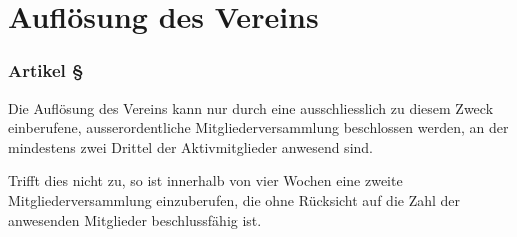 \section{Auflösung des Vereins}

\subsubsection*{Artikel §\articlenumber}
Die Auflösung des Vereins kann nur durch eine ausschliesslich zu diesem Zweck
einberufene, ausserordentliche Mitgliederversammlung beschlossen werden, an
der mindestens zwei Drittel der Aktivmitglieder anwesend sind.

Trifft dies nicht zu, so ist innerhalb von vier Wochen eine zweite
Mitgliederversammlung einzuberufen, die ohne Rücksicht auf die Zahl der
anwesenden Mitglieder beschlussfähig ist.
